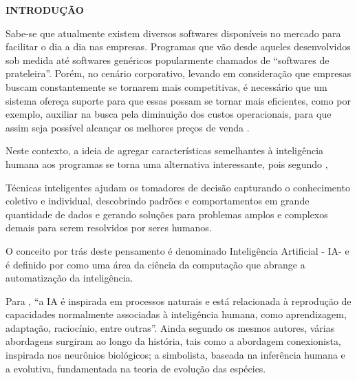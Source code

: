 \begin{center}
  \vspace{1.2em}
  \textbf{\large INTRODUÇÃO}
  \vspace{2.9em}
\end{center}
\thispagestyle{empty}



\par Sabe-se   que   atualmente   existem   diversos   softwares  
disponíveis no mercado para facilitar o dia a dia nas empresas.   
Programas que vão desde aqueles desenvolvidos sob   medida até   
softwares   genéricos   popularmente chamados   de   “softwares   
de   prateleira”. Porém, no cenário corporativo, levando em consideração 
que empresas buscam constantemente se tornarem  mais competitivas,   
é necessário que um sistema ofereça suporte para que essas possam se tornar   
mais eficientes, como por exemplo, auxiliar na busca pela diminuição dos custos   
operacionais, para que assim seja possível alcançar os melhores preços de venda
\cite{livro_laudon_sistemas_de_informacoes_gerenciais}.

\par Neste   contexto,   a   ideia   de   agregar   características  
semelhantes  à inteligência   humana   aos programas se torna uma alternativa
interessante, pois segundo
,

\begin{citacao}
Técnicas inteligentes ajudam os tomadores de decisão capturando o
conhecimento coletivo e individual, descobrindo padrões e  comportamentos
em grande quantidade de dados e gerando   soluções para problemas  amplos
e   complexos   demais   para   serem resolvidos por seres humanos.
\end{citacao} 

\par O conceito por trás deste pensamento é denominado Inteligência Artificial -
IA\footnotemark[1] - e é definido por  como
uma área da ciência da computação que abrange a automatização da inteligência.

\par Para , “a IA é inspirada  em  
processos naturais e está relacionada à reprodução de   capacidades  
normalmente   associadas   à   inteligência   humana,   como aprendizagem,
adaptação,  raciocínio,   entre   outras”.   Ainda   segundo   os   mesmos
autores,   várias  abordagens   surgiram   ao   longo   da   história,   tais   como  
a abordagem   conexionista,   inspirada   nos  neurônios   biológicos;   a  
simbolista, baseada   na   inferência   humana   e   a   evolutiva, fundamentada na teoria
de evolução das espécies.

